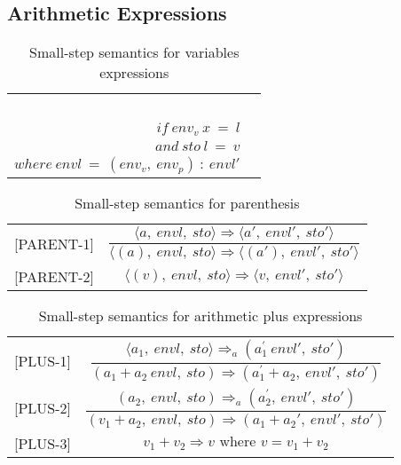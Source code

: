 \subsection{Arithmetic Expressions}

\begin{table}[H]
    \centering
    \begin{longtable}[c] { r c }
    \begin{tabular}{@{}c@{}} 
    [VAR] \\
    \newline \\
    \newline \\
    \newline \\
    \end{tabular}
  \begin{tabular}{@{}c@{}}   \( \langle a, \ envl, \ sto \rangle \Rightarrow \langle v, \ envl, \ sto \rangle  \)
  \\ \( if \ env_v \ x \ = \ l \)
  \\ \( and \ sto \ l \ = \ v \)
  \\ \( where \ envl \ = \ (env_v, \ env_p) \ : \ envl' \)
  \end{tabular}
        
 \end{longtable}
    \caption{Small-step semantics for variables expressions}\label{sem:bool-ass}
\end{table}

\begin{table}[H]
    \centering
    \begin{longtable}[c] { r c }
        [PARENT-1] & \( \dfrac{ \langle a, \ envl, \ sto \rangle \Rightarrow \langle a', \ envl', \ sto' \rangle}{ \langle (a), \ envl, \ sto \rangle \Rightarrow \langle (a'), \ envl', \ sto' \rangle} \) \\
        
        [PARENT-2] & \( \langle (v), \ envl, \ sto \rangle \Rightarrow \langle v, \ envl', \ sto' \rangle \) \\
    \end{longtable}
    \caption{Small-step semantics for parenthesis }
\end{table}

\begin{table}[H]
    \centering
    \begin{longtable}[c] { r c }
        [PLUS-1] & \( \dfrac{ \langle a_1,\ envl, \ sto \rangle \Rightarrow_a (a^{'}_{1}\ envl', \ sto')}{(a_1 + a_2\ envl,\ sto) \Rightarrow (a^{'}_{1} + a_2,\ envl',\ sto')} \) \\
        
        [PLUS-2] & \( \dfrac{(a_2,\ envl,\ sto) \Rightarrow_a (a^{'}_{2},\ envl',\ sto')}{(v_1 + a_2,\ envl,\ sto) \Rightarrow (a_{1} + a_2{'},\ envl',\ sto')} \) \\
        
        [PLUS-3] & \(v_1 + v_2 \Rightarrow v \text{ where } v = v_1 + v_2\) \\
    \end{longtable}
    \caption{Small-step semantics for arithmetic plus expressions}
\end{table}

